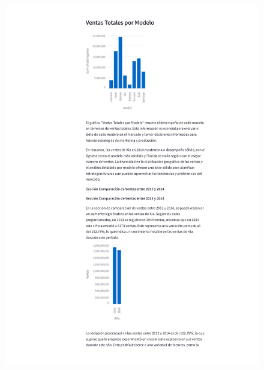 \begin{anexos}
\begin{figure}
		\includegraphics[height=\textheight]{reporte/4.png}
	\end{figure}
	\begin{figure}
		\centering

\end{figure}
\end{anexos}
